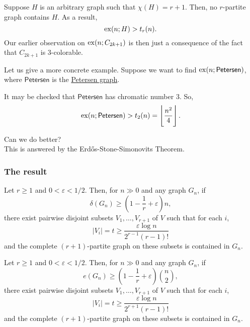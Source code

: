 \documentclass{article}
\begin{document}
			Suppose $H$ is an arbitrary graph such that $\chi(H) = r+1$. Then, no $r$-partite graph contains $H$. As a result,
			\[ \operatorname{ex}(n;H) > t_r(n). \]
			Our earlier observation on $\operatorname{ex}(n;C_{2k+1})$ is then just a consequence of the fact that $C_{2k+1}$ is $3$-colorable.

			Let us give a more concrete example. Suppose we want to find $\operatorname{ex}(n;\mathsf{Petersen})$, where $\mathsf{Petersen}$ is the \href{https://en.wikipedia.org/wiki/Petersen_graph}{Petersen graph}.


			It may be checked that $\mathsf{Petersen}$ has chromatic number $3$. So,
			\[ \operatorname{ex}(n;\mathsf{Petersen}) > t_2(n) = \left\lfloor \frac{n^2}{4} \right\rfloor. \]

			Can we do better?\\
			This is answered by the Erd\H{o}s-Stone-Simonovits Theorem.

		\subsubsection{The result}

			\begin{ftheo}
				\label{theo: erdos-stone v1}
				Let $r \ge 1$ and $0 < \varepsilon < 1/2$. Then, for $n\gg 0$ and any graph $G_n$, if
				\begin{equation}
					\label{eqn: erdos-stone v1 condition}
					\delta(G_n) \ge \left(1 - \frac{1}{r} + \varepsilon\right)n,
				\end{equation}
				there exist pairwise disjoint subsets $V_1,\ldots,V_{r+1}$ of $V$ such that for each $i$,
				\[ |V_i| = t \ge \frac{\varepsilon \log n}{2^{r-1}(r-1)!} \]
				and the complete $(r+1)$-partite graph on these subsets is contained in $G_n$.
			\end{ftheo}

			\begin{ftheo}
				\label{theo: erdos-stone v2}
				Let $r \ge 1$ and $0 < \varepsilon < 1/2$. Then, for $n\gg 0$ and any graph $G_n$, if
				\begin{equation}
					\label{eqn: erdos-stone v2 condition}
					e(G_n) \ge \left(1 - \frac{1}{r} + \varepsilon\right)\binom{n}{2},
				\end{equation}
				there exist pairwise disjoint subsets $V_1,\ldots,V_{r+1}$ of $V$ such that for each $i$,
				\[ |V_i| = t \ge \frac{\varepsilon \log n}{2^{r+1}(r-1)!} \]
				and the complete $(r+1)$-partite graph on these subsets is contained in $G_n$.
			\end{ftheo}
\end{document}
